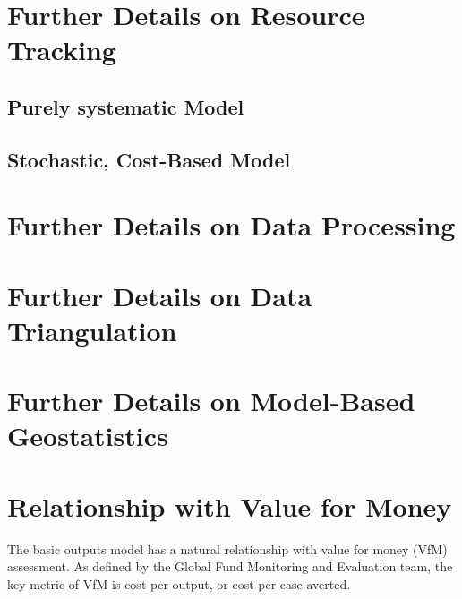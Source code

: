 \documentclass[twocolumn]{bmcart}%
\begin{document}
\section{Further Details on Resource Tracking} \label{resource_tracking}

\subsection{Purely systematic Model}


\subsection{Stochastic, Cost-Based Model}


\section{Further Details on Data Processing} \label{data_processing}




\section{Further Details on Data Triangulation} \label{triangulation}



\section{Further Details on Model-Based Geostatistics} \label{mbg}



\section{Relationship with Value for Money} \label{vfm}
The basic outputs model has a natural relationship with value for money (VfM) assessment. As defined by the Global Fund Monitoring and Evaluation team, the key metric of VfM is cost per output, or cost per case averted. \cite{kpi_team} \\
\end{document}
